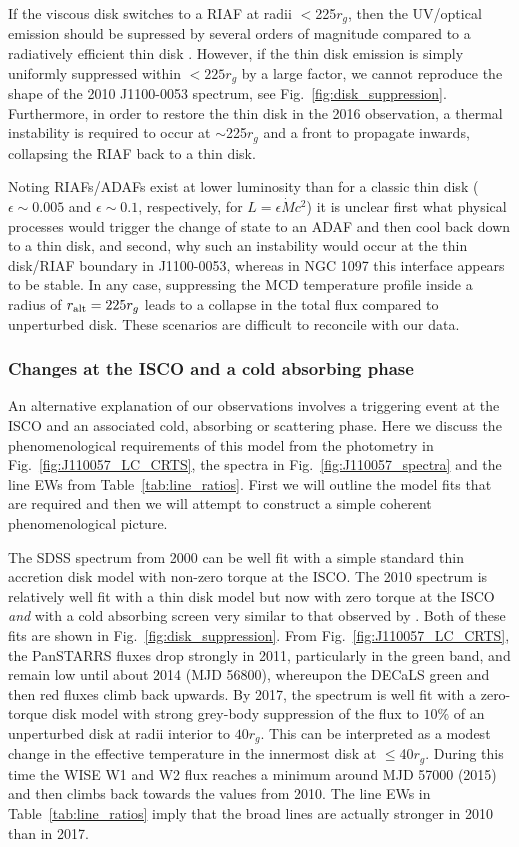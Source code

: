 \documentclass[a4paper,fleqn,usenatbib]{mnras}
\begin{document}
If the viscous disk switches to a RIAF at radii $<$225$r_{g}$, then
the UV/optical emission should be supressed by several orders of
magnitude compared to a radiatively efficient thin disk
\citep{Narayan1998, Abramowicz2002, Abramowicz2013}. However, if the
thin disk emission is simply uniformly suppressed within $<225r_{g}$
by a large factor, we cannot reproduce the shape of the 2010
J1100-0053 spectrum, see Fig.~\ref{fig:disk_suppression}. Furthermore,
in order to restore the thin disk in the 2016 observation, a thermal
instability is required to occur at $\sim$225$r_{g}$ and a front to
propagate inwards, collapsing the RIAF back to a thin disk.

Noting RIAFs/ADAFs exist at lower luminosity than for a classic thin
disk ($\epsilon \sim 0.005$ and $\epsilon \sim 0.1$, respectively, for
$L=\epsilon \dot{M} c^{2}$) it is unclear first what physical
processes would trigger the change of state to an ADAF and then cool
back down to a thin disk, and second, why such an instability would
occur at the thin disk/RIAF boundary in J1100-0053, whereas in NGC
1097 this interface appears to be stable. In any case, suppressing the
MCD temperature profile inside a radius of $r_{{\rm alt}} = 225 r_{g}$
leads to a collapse in the total flux compared to unperturbed disk.
These scenarios are difficult to reconcile with our data.


\subsubsection{Changes at the ISCO and a cold absorbing phase}
An alternative explanation of our observations involves a triggering
event at the ISCO and an associated cold, absorbing or scattering
phase. Here we discuss the phenomenological requirements of this model
from the photometry in Fig.~\ref{fig:J110057_LC_CRTS}, the spectra in
Fig.~\ref{fig:J110057_spectra} and the line EWs from
Table~\ref{tab:line_ratios}. First we will outline the model fits that
are required and then we will attempt to construct a simple coherent
phenomenological picture.

The SDSS spectrum from 2000 can be well fit with a simple standard
thin accretion disk model with non-zero torque at the ISCO. The 2010
spectrum is relatively well fit with a thin disk model but now with
zero torque at the ISCO \emph{and} with a cold absorbing screen very
similar to that observed by \citep{Guo2016}. Both of these fits are
shown in Fig.~\ref{fig:disk_suppression}. From
Fig.~\ref{fig:J110057_LC_CRTS}, the PanSTARRS fluxes drop strongly in
2011, particularly in the green band, and remain low until about 2014
(MJD 56800), whereupon the DECaLS green and then red fluxes climb back
upwards. By 2017, the spectrum is well fit with a zero-torque disk
model with strong grey-body suppression of the flux to $10\%$ of an
unperturbed disk at radii interior to $40r_{g}$. This can be
interpreted as a modest change in the effective temperature in the
innermost disk at $\leq$40$r_{g}$. During this time the WISE W1 and W2
flux reaches a minimum around MJD 57000 (2015) and then climbs back
towards the values from 2010. The line EWs in
Table~\ref{tab:line_ratios} imply that the broad lines are actually
stronger in 2010 than in 2017.
\end{document}

